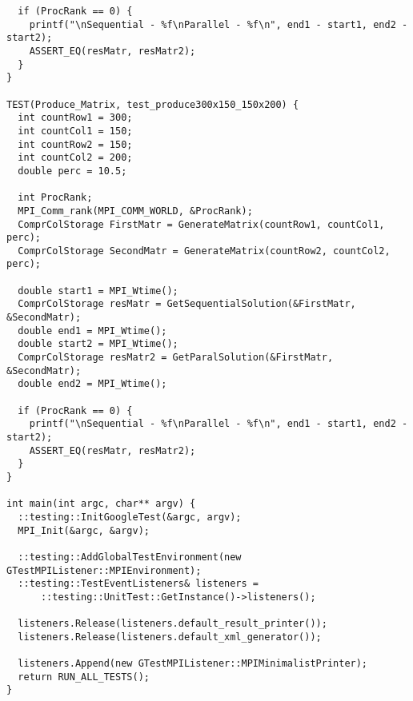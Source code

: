 \documentclass{report}
\begin{document}
\begin{lstlisting}
  if (ProcRank == 0) {
    printf("\nSequential - %f\nParallel - %f\n", end1 - start1, end2 - start2);
    ASSERT_EQ(resMatr, resMatr2);
  }
}

TEST(Produce_Matrix, test_produce300x150_150x200) {
  int countRow1 = 300;
  int countCol1 = 150;
  int countRow2 = 150;
  int countCol2 = 200;
  double perc = 10.5;

  int ProcRank;
  MPI_Comm_rank(MPI_COMM_WORLD, &ProcRank);
  ComprColStorage FirstMatr = GenerateMatrix(countRow1, countCol1, perc);
  ComprColStorage SecondMatr = GenerateMatrix(countRow2, countCol2, perc);

  double start1 = MPI_Wtime();
  ComprColStorage resMatr = GetSequentialSolution(&FirstMatr, &SecondMatr);
  double end1 = MPI_Wtime();
  double start2 = MPI_Wtime();
  ComprColStorage resMatr2 = GetParalSolution(&FirstMatr, &SecondMatr);
  double end2 = MPI_Wtime();

  if (ProcRank == 0) {
    printf("\nSequential - %f\nParallel - %f\n", end1 - start1, end2 - start2);
    ASSERT_EQ(resMatr, resMatr2);
  }
}

int main(int argc, char** argv) {
  ::testing::InitGoogleTest(&argc, argv);
  MPI_Init(&argc, &argv);

  ::testing::AddGlobalTestEnvironment(new GTestMPIListener::MPIEnvironment);
  ::testing::TestEventListeners& listeners =
      ::testing::UnitTest::GetInstance()->listeners();

  listeners.Release(listeners.default_result_printer());
  listeners.Release(listeners.default_xml_generator());

  listeners.Append(new GTestMPIListener::MPIMinimalistPrinter);
  return RUN_ALL_TESTS();
}
\end{lstlisting}
\end{document}

